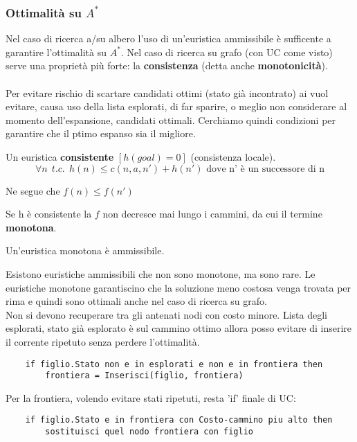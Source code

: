 \subsubsection{Ottimalità su $A^*$}
Nel caso di ricerca a/su albero l'uso di un'euristica ammissibile è sufficente a garantire l'ottimalità su $A^*$.
Nel caso di ricerca su grafo (con UC come visto) serve una proprietà più forte: la \textbf{consistenza} (detta anche \textbf{monotonicità}).\\\\
Per evitare rischio di scartare candidati ottimi (stato già incontrato) ai vuol evitare, causa uso della lista esplorati, di far sparire, o meglio
non considerare al momento dell'espansione, candidati ottimali. Cerchiamo quindi condizioni per garantire che il ptimo espanso sia il migliore.
\begin{definition} 
    Un euristica \textbf{consistente} $[h(goal) = 0]$ (consistenza locale).
    $$\forall n \:\: t.c. \:\: h(n) \leq c(n, a, n') + h(n') \text{ dove n' è un successore di n}$$
\end{definition}
\hspace{-15pt}Ne segue che $f(n) \leq f(n')$
\begin{note}
    Se h è consistente la $f$ non decresce mai lungo i cammini, da cui il termine \textbf{monotona}.
\end{note}
\begin{theorem}
    Un'euristica monotona è ammissibile.
\end{theorem}
\hspace{-15pt}Esistono euristiche ammissibili che non sono monotone, ma sono rare. Le euristiche monotone garantiscino che la soluzione meno costosa 
venga trovata per rima e quindi sono ottimali anche nel caso di ricerca su grafo.\\
Non si devono recuperare tra gli antenati nodi con costo minore. Lista degli esplorati, stato già esplorato è sul cammino ottimo allora posso
evitare di inserire il corrente ripetuto senza perdere l'ottimalità.
\begin{lstlisting}
    if figlio.Stato non e in esplorati e non e in frontiera then
        frontiera = Inserisci(figlio, frontiera)
\end{lstlisting}
Per la frontiera, volendo evitare stati ripetuti, resta 'if' finale di UC:
\begin{lstlisting}
    if figlio.Stato e in frontiera con Costo-cammino piu alto then
        sostituisci quel nodo frontiera con figlio 
\end{lstlisting}